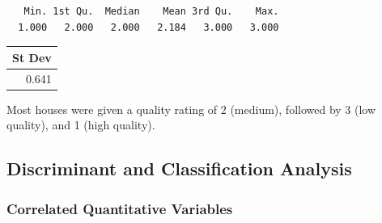 \documentclass[
  letterpaper,
  DIV=11,
  numbers=noendperiod]{scrartcl}
\begin{document}
\begin{verbatim}
   Min. 1st Qu.  Median    Mean 3rd Qu.    Max. 
  1.000   2.000   2.000   2.184   3.000   3.000 
\end{verbatim}

\begin{tabular}{r}
\hline
St Dev\\
\hline
0.641\\
\hline
\end{tabular}

Most houses were given a quality rating of 2 (medium), followed by 3
(low quality), and 1 (high quality).

\hypertarget{discriminant-and-classification-analysis}{%
\subsection{Discriminant and Classification
Analysis}\label{discriminant-and-classification-analysis}}

\hypertarget{correlated-quantitative-variables}{%
\subsubsection{Correlated Quantitative
Variables}\label{correlated-quantitative-variables}}
\end{document}
